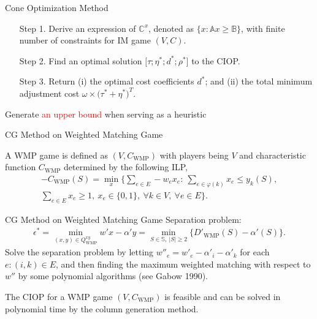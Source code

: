 \documentclass[14pt]{beamer}
\begin{document}
\begin{frame}{Cone Optimization Method}
\begin{itemize}
\footnotesize
\justifying
\item[Step 1.] Derive an expression of $\mathbb{C}^x$, denoted as $\big\{x:\mathbb{A}x \geq \mathbb{B}\big\}$, with finite number of constraints for IM game $(V,C)$.
\item[Step 2.] Find an optimal solution $\big[\tau;\eta^*;d^*;\rho^*\big]$ to the CIOP.
\item[Step 3.] Return (i) the optimal cost coefficients $d^*$; and (ii) the total minimum adjustment cost $\omega \times \big( \tau^*+\eta^* \big)^T$.
\end{itemize}
\begin{shaded}
\centering
Generate \textcolor{red}{an upper bound} when serving as a heuristic
\end{shaded}
\end{frame}


\begin{frame}{CG Method on Weighted Matching Game}
\small
\begin{definition}\label{defi:tmp}
\justifying
A WMP game is defined as $(V,C_{\mathrm{WMP}})$ with players being $V$ and characteristic function  $C_{\mathrm{WMP}}$ determined by the following ILP,
\begin{eqnarray*}\label{eqn:colp2}
-C_{\mathrm{WMP}}(S) = \min_{x} \bigg\{\sum_{e \in E} -w_{e}x_{e}:~\sum_{e \in \varphi(k)}x_{e} \leq y_k(S),\\
\sum_{e \in E} x_e \geq 1,~x_{e} \in \{0,1\}, ~\forall k \in V,~\forall e \in E
\bigg\}.
\end{eqnarray*}
\end{definition}
\end{frame}


\begin{frame}{CG Method on Weighted Matching Game}
\small
\justifying
Separation problem:
\begin{eqnarray*}\label{eqn:wmpspseparation}
\epsilon^* = \min_{(x,y) \in Q^{xy}_{\mathrm{WMP}}} w'x-\alpha'y = \min_{S \in \mathbb{S},~|S| \geq 2} \big\{ D'_{\mathrm{WMP}}(S) - \alpha'(S) \big\}.
\end{eqnarray*}
Solve the separation problem by letting $w''_{e} = w'_{e} - \alpha'_i - \alpha'_k$ for each $e:(i,k) \in E$, and then finding the maximum weighted matching with respect to $w''$ by some polynomial algorithms (see Gabow 1990).
\vspace{3mm}
\begin{lemma}\label{lemma:wmpfeasible}
\justifying
The CIOP for a WMP game $(V,C_{\mathrm{WMP}})$ is feasible and can be solved in polynomial time by the column generation method.
\end{lemma}
\end{frame}
\end{document}
